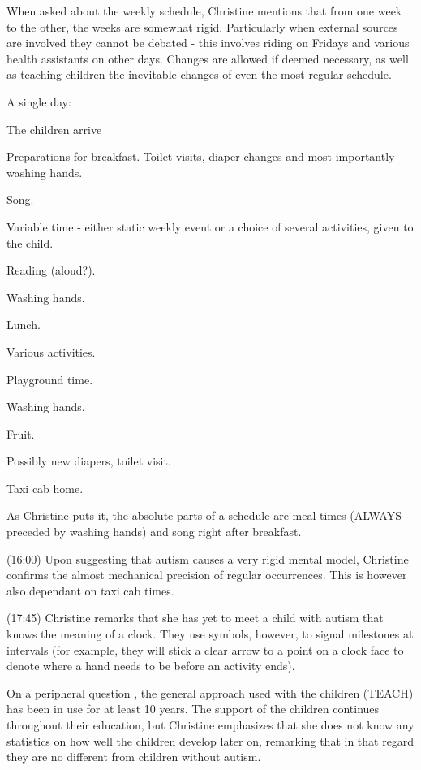When asked about the weekly schedule, Christine mentions that from one week to the other, the weeks are somewhat rigid. Particularly when external sources are involved they cannot be debated - this involves riding on Fridays and various health assistants on other days. Changes are allowed if deemed necessary, as well as teaching children the inevitable changes of even the most regular schedule.

A single day:
\begin{description}
	\item[7.30 to 8.50] The children arrive
	\item[9.00] Preparations for breakfast. Toilet visits, diaper changes and most importantly washing hands.
	\item Song.
	\item Variable time - either static weekly event or a choice of several activities, given to the child.
	\item Reading (aloud?).
	\item Washing hands.
	\item Lunch.
	\item Various activities.
	\item Playground time.
	\item Washing hands.
	\item Fruit.
	\item Possibly new diapers, toilet visit.
	\item Taxi cab home.
\end{description}

As Christine puts it, the absolute parts of a schedule are meal times (ALWAYS preceded by washing hands) and song right after breakfast.

(16:00) Upon suggesting that autism causes a very rigid mental model, Christine confirms the almost mechanical precision of regular occurrences. This is however also dependant on taxi cab times.

(17:45) Christine remarks that she has yet to meet a child with autism that knows the meaning of a clock. They use symbols, however, to signal milestones at intervals (for example, they will stick a clear arrow to a point on a clock face to denote where a hand needs to be before an activity ends).

On a peripheral question , the general approach used with the children (TEACH) has been in use for at least 10 years. The support of the children continues throughout their education, but Christine emphasizes that she does not know any statistics on how well the children develop later on, remarking that in that regard they are no different from children without autism.

